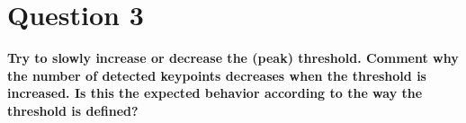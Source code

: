 \section{Question 3}

{\bfseries Try to slowly increase or decrease the (peak) threshold. Comment
why the number of detected keypoints decreases when the threshold is increased.
Is this the expected behavior according to the way the threshold is defined?}